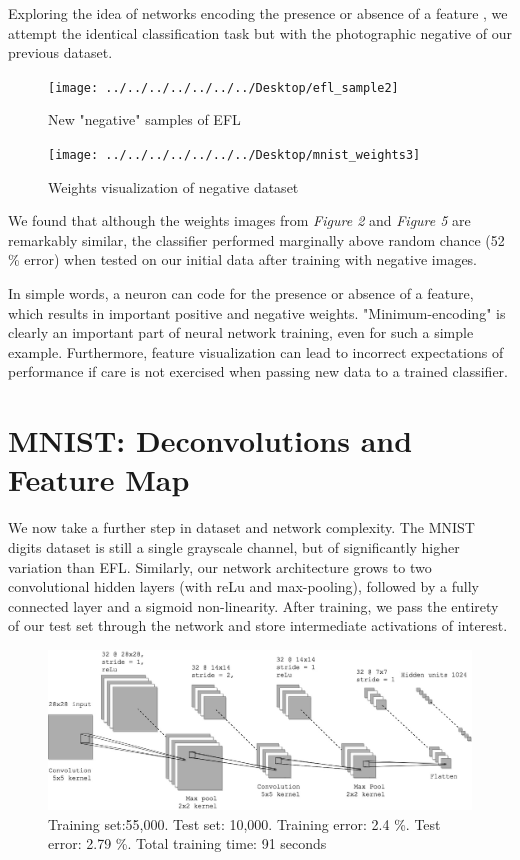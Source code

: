 \documentclass[12pt]{article}
\begin{document}
Exploring the idea of networks encoding the presence or absence of a feature \cite{bengio}, we attempt the identical classification task but with the photographic negative of our previous dataset.

\begin{figure}[h]
\centering
\texttt{[image: ../../../../../../../Desktop/efl\_sample2]}
\caption{New "negative" samples of EFL}
\label{fig:eflsample2}
\end{figure}

\begin{figure}[h]
	\centering
	\texttt{[image: ../../../../../../../Desktop/mnist\_weights3]}
	\caption{Weights visualization of negative dataset}
	\label{fig:mnistweights3}
\end{figure}

\pagebreak

We found that although the weights images from \textit{Figure 2} and \textit{Figure 5} are remarkably similar, the classifier performed marginally above random chance (52 \% error) when tested on our initial data after training with negative images.

In simple words, a neuron can code for the presence or absence of a feature, which results in important positive and negative weights. "Minimum-encoding" is clearly an important part of neural network training, even for such a simple example. Furthermore, feature visualization can lead to incorrect expectations of performance if care is not exercised when passing new data to a trained classifier. \\

\pagebreak

\section{MNIST: Deconvolutions and Feature Map}

We now take a further step in dataset and network complexity. The MNIST digits dataset is still a single grayscale channel, but of significantly higher variation than EFL. Similarly, our network architecture grows to two convolutional hidden layers (with reLu and max-pooling), followed by a fully connected layer and a sigmoid non-linearity. After training, we pass the entirety of our test set through the network and store intermediate activations of interest.\\

\begin{figure}[H]
\centering
\includegraphics[width=1\linewidth]{../diagrams/MNIST_network}
\caption{Training set:55,000. Test set: 10,000. Training error: 2.4 \%. Test error: 2.79 \%. Total training time: 91 seconds}
\label{fig:mnistnetwork}
\end{figure}
\end{document}
